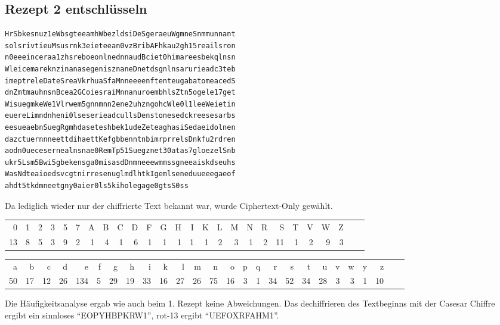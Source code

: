 \subsection{Rezept 2 entschlüsseln}
\label{RezeptZweiEntschluesseln}

\begin{lstlisting}[caption={Das verschlüsselte 2. Rezept: Rezept2NR.txt},
 linewidth=\textwidth,
 breaklines, breakatwhitespace=false]
HrSbkesnuz1eWbsgteeamhWbezldsiDeSgeraeuWgmneSnmmunnant
solsrivtieuMsusrnk3eieteean0vzBribAFhkau2gh15reailsron
n0eeeinceraa1zhsreboeonlnednnaudBciet0himareesbekqlnsn
WleicemareknzinanasegenisznaneDnetdsgnlnsarurieadc3teb
imeptreleDateSreaVkrhuaSfaMnneeeenftenteugabatomeacedS
dnZmtmauhnsnBcea2GCoiesraiMnnanuroembhlsZtn5ogele17get
WisuegmkeWe1Vlrwem5gnnmnn2ene2uhzngohcWle0l1leeWeietin
euereLimndnheni0lseserieadcullsDenstonesedckreesesarbs
eesueaebnSuegRgmhdaseteshbek1udeZeteaghasiSedaeidolnen
dazctuernnneettdihaettKefgbbenntnbimrprrelsDnkfu2rdren
aodn0uecesernealnsnae0RemTp51Suegznet30atas7gloezelSnb
ukr5Lsm5Bwi5gbekensga0misasdDnmneeewmmssgneeaiskdseuhs
WasNdteaioedsvcgtnirresenuglmdlhtkIgemlseneduueeegaeof
ahdt5tkdmneetgny0aier0ls5kiholegage0gtsS0ss
\end{lstlisting}

Da lediglich wieder nur der chiffrierte Text bekannt war, wurde Ciphertext-Only
gewählt.

\begin{table}\footnotesize
\begin{tabular}{*{26}{@{\hspace{1ex}}r}}
 0 & 1 & 2 & 3 & 5 & 7 & A & B & C & D & F & G & H & I & K & L & M & N & R & S & T & V & W & Z \\
 13 & 8 & 5 & 3 & 9 & 2 & 1 & 4 & 1 & 6 & 1 & 1 & 1 & 1 & 1 & 2 & 3 & 1 & 2 & 11 & 1 & 2 & 9 & 3 \\
\end{tabular}

\begin{tabular}{*{26}{@{\hspace{1ex}}r}}
 a & b & c & d & e & f & g & h & i & k & l & m & n & o & p & q & r & s & t & u & v & w & y & z \\
 50 & 17 & 12 & 26 & 134 & 5 & 29 & 19 & 33 & 16 & 27 & 26 & 75 & 16 & 3 & 1 & 34 & 52 & 34 & 28 & 3 & 3 & 1 & 10 \\
\end{tabular}
\end{table}

Die Häufigkeitsanalyse ergab wie auch beim 1. Rezept keine Abweichungen. Das
dechiffrieren des Textbeginns mit der Casesar Chiffre ergibt ein sinnloses
``EOPYHBPKRW1'', rot-13 ergibt ``UEFOXRFAHM1''.

